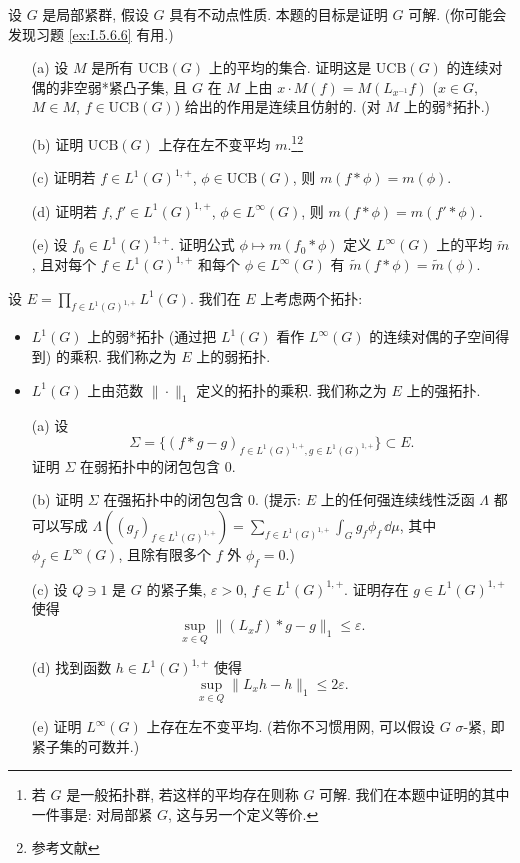 \begin{exercise}[不动点性质蕴含可解性]
\label{ex:III.6.3.3}
设 $G$ 是局部紧群, 假设 $G$ 具有不动点性质. 本题的目标是证明 $G$ 可解. (你可能会发现习题 \ref{ex:I.5.6.6} 有用.)
\begin{enumerate}
\item[(a)] 设 $M$ 是所有 $\mathrm{UCB}(G)$ 上的平均的集合. 证明这是 $\mathrm{UCB}(G)$ 的连续对偶的非空弱*紧凸子集, 且 $G$ 在 $M$ 上由 $x \cdot M(f) = M(L_{x^{-1}}f)$ ($x \in G$, $M \in M$, $f \in \mathrm{UCB}(G)$) 给出的作用是连续且仿射的. (对 $M$ 上的弱*拓扑.)
\item[(b)] 证明 $\mathrm{UCB}(G)$ 上存在左不变平均 $m$.\footnote{若 $G$ 是一般拓扑群, 若这样的平均存在则称 $G$ 可解. 我们在本题中证明的其中一件事是: 对局部紧 $G$, 这与另一个定义等价.}\footnote{参考文献}
\item[(c)] 证明若 $f \in L^1(G)^{1,+}$, $\phi \in \mathrm{UCB}(G)$, 则 $m(f * \phi) = m(\phi)$.
\item[(d)] 证明若 $f, f' \in L^1(G)^{1,+}$, $\phi \in L^{\infty}(G)$, 则 $m(f * \phi) = m(f' * \phi)$.
\item[(e)] 设 $f_0 \in L^1(G)^{1,+}$. 证明公式 $\phi \longmapsto m(f_0 * \phi)$ 定义 $L^{\infty}(G)$ 上的平均 $\tilde{m}$, 且对每个 $f \in L^1(G)^{1,+}$ 和每个 $\phi \in L^{\infty}(G)$ 有 $\tilde{m}(f * \phi) = \tilde{m}(\phi)$.
\end{enumerate}
设 $E = \prod_{f \in L^1(G)^{1,+}}L^1(G)$. 我们在 $E$ 上考虑两个拓扑:
\begin{itemize}
\item $L^1(G)$ 上的弱*拓扑 (通过把 $L^1(G)$ 看作 $L^{\infty}(G)$ 的连续对偶的子空间得到) 的乘积. 我们称之为 $E$ 上的弱拓扑.
\item $L^1(G)$ 上由范数 $\|\cdot\|_1$ 定义的拓扑的乘积. 我们称之为 $E$ 上的强拓扑.
\end{itemize}
\begin{enumerate}
\item[(a)] 设
\[
\Sigma = \{(f * g - g)_{f \in L^1(G)^{1,+}, g \in L^1(G)^{1,+}}\} \subset E.
\]
证明 $\Sigma$ 在弱拓扑中的闭包包含 $0$.
\item[(b)] 证明 $\Sigma$ 在强拓扑中的闭包包含 $0$. (提示: $E$ 上的任何强连续线性泛函 $\Lambda$ 都可以写成 $\Lambda((g_f)_{f \in L^1(G)^{1,+}}) = \sum_{f \in L^1(G)^{1,+}}\int_G g_f\phi_f\,\dd\mu$, 其中 $\phi_f \in L^{\infty}(G)$, 且除有限多个 $f$ 外 $\phi_f = 0$.)
\item[(c)] 设 $Q \ni 1$ 是 $G$ 的紧子集, $\varepsilon > 0$, $f \in L^1(G)^{1,+}$. 证明存在 $g \in L^1(G)^{1,+}$ 使得
\[
\sup_{x \in Q}\|(L_xf) * g - g\|_1 \leq \varepsilon.
\]
\item[(d)] 找到函数 $h \in L^1(G)^{1,+}$ 使得
\[
\sup_{x \in Q}\|L_xh - h\|_1 \leq 2\varepsilon.
\]
\item[(e)] 证明 $L^{\infty}(G)$ 上存在左不变平均. (若你不习惯用网, 可以假设 $G$ $\sigma$-紧, 即紧子集的可数并.)
\end{enumerate}
\end{exercise}

